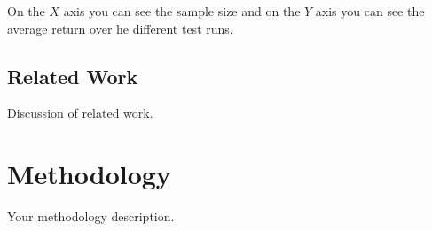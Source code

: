 \documentclass[12pt]{article}
\begin{document}
On the $X$ axis you can see the sample size and on the $Y$ axis you can see the average return over he different test runs.




\newpage
\subsection{Related Work}
Discussion of related work.


\newpage
\section{Methodology}
Your methodology description.



\newpage
\end{document}
